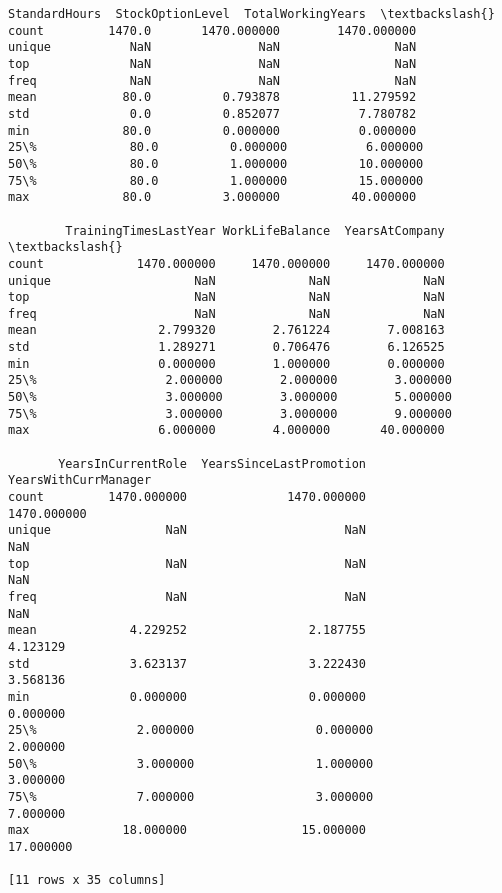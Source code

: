 \documentclass[11pt]{article}
\begin{document}
\begin{tcolorbox}[breakable, size=fbox, boxrule=.5pt, pad at break*=1mm, opacityfill=0]
\begin{Verbatim}[commandchars=\\\{\}]
       StandardHours  StockOptionLevel  TotalWorkingYears  \textbackslash{}
count         1470.0       1470.000000        1470.000000
unique           NaN               NaN                NaN
top              NaN               NaN                NaN
freq             NaN               NaN                NaN
mean            80.0          0.793878          11.279592
std              0.0          0.852077           7.780782
min             80.0          0.000000           0.000000
25\%             80.0          0.000000           6.000000
50\%             80.0          1.000000          10.000000
75\%             80.0          1.000000          15.000000
max             80.0          3.000000          40.000000

        TrainingTimesLastYear WorkLifeBalance  YearsAtCompany  \textbackslash{}
count             1470.000000     1470.000000     1470.000000
unique                    NaN             NaN             NaN
top                       NaN             NaN             NaN
freq                      NaN             NaN             NaN
mean                 2.799320        2.761224        7.008163
std                  1.289271        0.706476        6.126525
min                  0.000000        1.000000        0.000000
25\%                  2.000000        2.000000        3.000000
50\%                  3.000000        3.000000        5.000000
75\%                  3.000000        3.000000        9.000000
max                  6.000000        4.000000       40.000000

       YearsInCurrentRole  YearsSinceLastPromotion  YearsWithCurrManager
count         1470.000000              1470.000000           1470.000000
unique                NaN                      NaN                   NaN
top                   NaN                      NaN                   NaN
freq                  NaN                      NaN                   NaN
mean             4.229252                 2.187755              4.123129
std              3.623137                 3.222430              3.568136
min              0.000000                 0.000000              0.000000
25\%              2.000000                 0.000000              2.000000
50\%              3.000000                 1.000000              3.000000
75\%              7.000000                 3.000000              7.000000
max             18.000000                15.000000             17.000000

[11 rows x 35 columns]
\end{Verbatim}
\end{tcolorbox}
        
\end{document}
